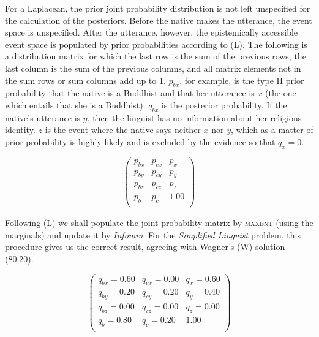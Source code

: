 \documentclass[11pt]{article}
\begin{document}
For a Laplacean, the prior joint probability distribution is not left
unspecified for the calculation of the posteriors. Before the native
makes the utterance, the event space is unspecified. After the
utterance, however, the epistemically accessible event space is
populated by prior probabilities according to (L). The following is a
distribution matrix for which the last row is the sum of the previous
rows, the last column is the sum of the previous columns, and all
matrix elements not in the sum rows or sum columns add up to 1.
$p_{bx}$, for example, is the type II prior probability that the
native is a Buddhist and that her utterance is $x$ (the one which
entails that she is a Buddhist). $q_{bx}$ is the posterior
probability. If the native's utterance is $y$, then the linguist has
no information about her religious identity. $z$ is the event where
the native says neither $x$ nor $y$, which as a matter of prior
probability is highly likely and is excluded by the evidence so that
$q_{x}=0$.

\begin{equation}
  \label{eq:e1}
  \left(
    \begin{array}{ccc}
      p_{bx} & p_{cx} & p_{x} \\
      p_{by} & p_{cy} & p_{y} \\
      p_{bz} & p_{cz} & p_{z} \\
      p_{b} & p_{c} & 1.00 \\
    \end{array}\right)
\end{equation}


Following (L) we shall populate the joint probability matrix by
\textsc{maxent} (using the marginals) and update it by
\emph{Infomin}. For the \emph{Simplified Linguist} problem, this
procedure gives us the correct result, agreeing with Wagner's (W)
solution (80:20).

\begin{equation}
  \label{eq:e2}
  \left(
    \begin{array}{ccc}
      q_{bx}=0.60 & q_{cx}=0.00 & q_{x}=0.60 \\
      q_{by}=0.20 & q_{cy}=0.20 & q_{y}=0.40 \\
      q_{bz}=0.00 & q_{cz}=0.00 & q_{z}=0.00 \\
      q_{b}=0.80 & q_{c}=0.20 & 1.00 \\
    \end{array}\right)
\end{equation}
\end{document}
